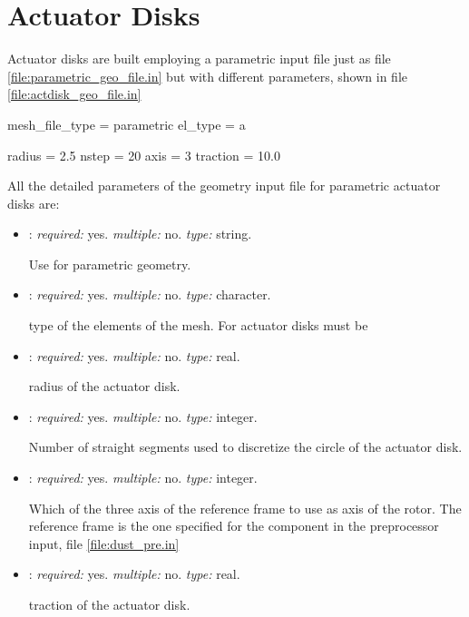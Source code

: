 \section{Actuator Disks}
\label{sec:ActuatorDisks}
Actuator disks are built employing a parametric input file just as file 
\ref{file:parametric_geo_file.in} but with different parameters, shown in file 
\ref{file:actdisk_geo_file.in} 

\begin{inputfile}[frame=single, caption={actdisk\_geo\_file.in}, 
  label={file:actdisk_geo_file.in}]
mesh_file_type = parametric
el_type = a

radius = 2.5
nstep = 20
axis = 3
traction = 10.0
\end{inputfile}


All the detailed parameters of the geometry input file for parametric actuator disks are:
\begin{itemize}
\item {}: \textit{required:} yes. \textit{multiple:} no. 
\textit{type:} string. 

Use  for parametric geometry.

\item {}: \textit{required:} yes. \textit{multiple:} no. 
\textit{type:} character.

type of the elements of the mesh. For actuator disks must be 

\item {}: \textit{required:} yes. \textit{multiple:} no. \textit{type:} real.

radius of the actuator disk.

\item {}: \textit{required:} yes. \textit{multiple:} no. \textit{type:} integer.

Number of straight segments used to discretize the circle of the actuator disk.

\item {}: \textit{required:} yes. \textit{multiple:} no. \textit{type:} integer.

Which of the three axis of the reference frame to use as axis of the rotor. 
The reference frame is the one specified for the component in the preprocessor input, 
file \ref{file:dust_pre.in}

\item {}: \textit{required:} yes. \textit{multiple:} no. \textit{type:} real.

traction of the actuator disk.
\end{itemize}



